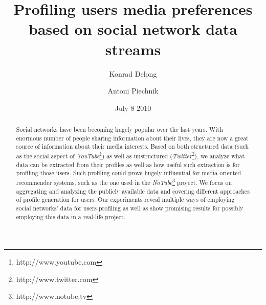 \documentclass{article}
\begin{document}
\title{\textbf{Profiling users media preferences based on social network data streams}}
\author{Konrad Delong \and Antoni Piechnik}
\date{July 8 2010}

\maketitle

\begin{abstract} Social networks have been becoming hugely popular over the last
years. With enormous number of people sharing information about their lives,
they are now a great source of information about their media interests. Based on both
structured data (such as the social aspect of \textit{YouTube}\footnote[1]{http://www.youtube.com}) as well as unstructured
(\textit{Twitter}\footnote[2]{http://www.twitter.com}), we analyze what data can be extracted from their profiles as well as
how useful such extraction is for profiling those users. Such profiling could
prove hugely influential for media-oriented recommender systems, such as the one
used in the \textit{NoTube}\footnote[3]{http://www.notube.tv} project.
We focus on aggregating and analyzing the publicly available data and covering
different approaches of profile generation
for users. Our experiments reveal multiple ways of employing social networks'
data for users profiling as well as show promising results for possibly employing
this data in a real-life project.
\end{abstract}





















\end{document}
